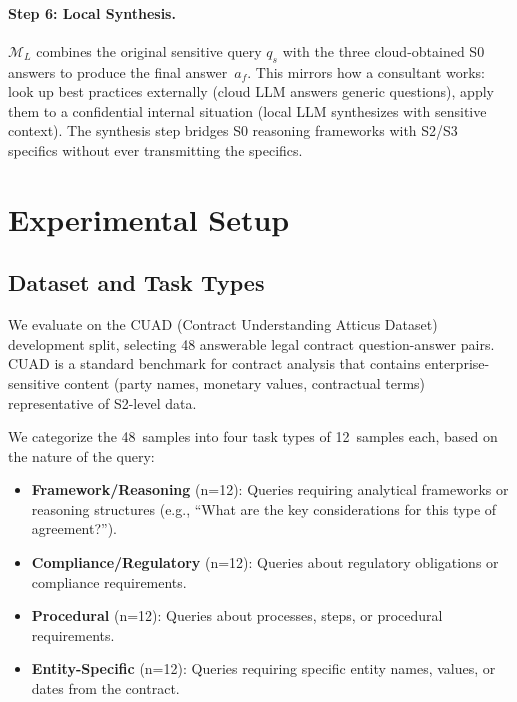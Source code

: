 \documentclass[sigconf,anonymous,review,balance=false]{acmart}
\begin{document}
\paragraph{Step 6: Local Synthesis.} $\mathcal{M}_L$ combines the original sensitive query $q_s$ with the three cloud-obtained S0 answers to produce the final answer~$a_f$. This mirrors how a consultant works: look up best practices externally (cloud LLM answers generic questions), apply them to a confidential internal situation (local LLM synthesizes with sensitive context). The synthesis step bridges S0 reasoning frameworks with S2/S3 specifics without ever transmitting the specifics.

\section{Experimental Setup}
\label{sec:setup}

\subsection{Dataset and Task Types}
\label{sec:dataset}

We evaluate on the CUAD (Contract Understanding Atticus Dataset) development split, selecting 48 answerable legal contract question-answer pairs. CUAD is a standard benchmark for contract analysis that contains enterprise-sensitive content (party names, monetary values, contractual terms) representative of S2-level data.

We categorize the 48~samples into four task types of 12~samples each, based on the nature of the query:

\begin{itemize}
\item \textbf{Framework/Reasoning} (n=12): Queries requiring analytical frameworks or reasoning structures (e.g., ``What are the key considerations for this type of agreement?'').
\item \textbf{Compliance/Regulatory} (n=12): Queries about regulatory obligations or compliance requirements.
\item \textbf{Procedural} (n=12): Queries about processes, steps, or procedural requirements.
\item \textbf{Entity-Specific} (n=12): Queries requiring specific entity names, values, or dates from the contract.
\end{itemize}
\end{document}
